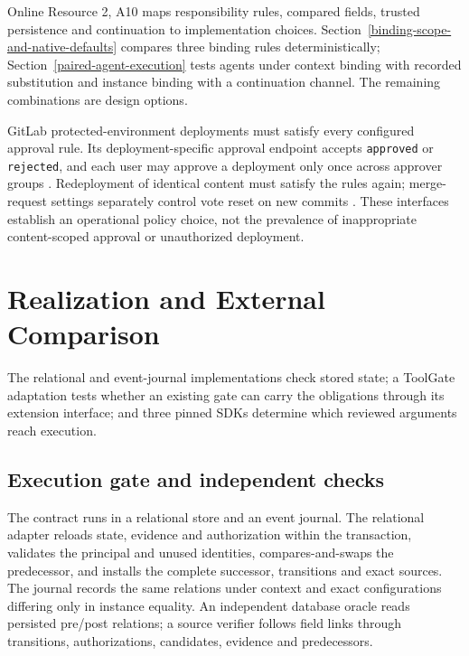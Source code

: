 \documentclass[pdflatex,sn-basic]{sn-jnl}
\begin{document}
Online Resource 2, A10 maps responsibility rules, compared fields, trusted persistence and continuation to implementation choices. Section~\ref{binding-scope-and-native-defaults} compares three binding rules deterministically; Section~\ref{paired-agent-execution} tests agents under context binding with recorded substitution and instance binding with a continuation channel. The remaining combinations are design options.

GitLab protected-environment deployments must satisfy every configured approval rule. Its deployment-specific approval endpoint accepts \texttt{approved} or \texttt{rejected}, and each user may approve a deployment only once across approver groups \citep{gitlab-deployment-approval}. Redeployment of identical content must satisfy the rules again; merge-request settings separately control vote reset on new commits \citep{gitlab-approvals}. These interfaces establish an operational policy choice, not the prevalence of inappropriate content-scoped approval or unauthorized deployment.

\section{Realization and External Comparison}\label{realization-and-external-comparison}

The relational and event-journal implementations check stored state; a ToolGate adaptation tests whether an existing gate can carry the obligations through its extension interface; and three pinned SDKs determine which reviewed arguments reach execution.

\subsection{Execution gate and independent checks}\label{execution-gate-and-independent-checks}

The contract runs in a relational store and an event journal. The relational adapter reloads state, evidence and authorization within the transaction, validates the principal and unused identities, compares-and-swaps the predecessor, and installs the complete successor, transitions and exact sources. The journal records the same relations under context and exact configurations differing only in instance equality. An independent database oracle reads persisted pre/post relations; a source verifier follows field links through transitions, authorizations, candidates, evidence and predecessors.
\end{document}
